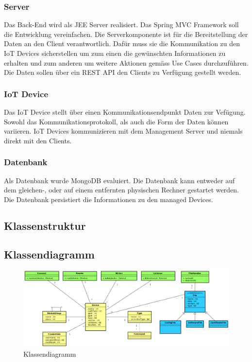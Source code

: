 \subsubsection{Server}
Das Back-End wird als JEE Server realisiert. Das Spring MVC Framework soll die Entwicklung vereinfachen. Die Serverkomponente ist für die Bereitstellung der Daten an den Client verantwortlich. Dafür muss sie die Kommunikation zu den IoT Devices sicherstellen um zum einen die gewünschten Informationen zu erhalten und zum anderen um weitere Aktionen gemäss Use Cases durchzuführen. Die Daten sollen über ein REST API den Clients zu Verfügung gestellt werden.
\subsubsection{IoT Device}
Das IoT Device stellt über einen Kommunikationsendpunkt Daten zur Vefügung. Sowohl das Kommunikationsprotokoll, als auch die Form der Daten können variieren. IoT Devices kommunizieren mit dem Management Server und niemals direkt mit den Clients.
\subsubsection{Datenbank}
Als Datenbank wurde MongoDB evaluiert. Die Datenbank kann entweder auf dem gleichen-, oder auf einem entfernten physischen Rechner gestartet werden. Die Datenbank persistiert die Informationen zu den managed Devices.
\newpage


\begin{landscape}
\section{Klassenstruktur}
\subsection{Klassendiagramm}
\begin{figure}[H]
\centering
\includegraphics[width=1\textwidth]{images/domainmodel.png}
\caption{Klassendiagramm}
\end{figure}
\end{landscape}
